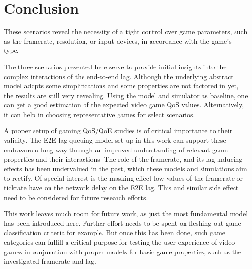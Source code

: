 \section{Conclusion}
\label{sec:conclusion}

These scenarios reveal the necessity of a tight control over game parameters, such as the framerate, resolution, or input devices, in accordance with the game's type.


The three scenarios presented here serve to provide initial insights into the complex interactions of the end-to-end lag. Although the underlying abstract model adopts some simplifications and some properties are not factored in yet, the results are still very revealing. Using the model and simulator as baseline, one can get a good estimation of the expected video game \gls{QoS} values. Alternatively, it can help in choosing representative games for select scenarios.


A proper setup of gaming \gls{QoS}/\gls{QoE} studies is of critical importance to their validity. The \gls{E2E} lag queuing model set up in this work can support these endeavors a long way through an improved understanding of relevant game properties and their interactions. The role of the framerate, and its lag-inducing effects has been undervalued in the past, which these models and simulations aim to rectify. Of special interest is the masking effect low values of the framerate or tickrate have on the network delay on the \gls{E2E} lag. This and similar side effect need to be considered for future research efforts.


This work leaves much room for future work, as just the most fundamental model has been introduced here. Further effort needs to be spent on fleshing out game classification criteria for example. But once this has been done, such game categories can fulfill a critical purpose for testing the user experience of video games in conjunction with proper models for basic game properties, such as the investigated framerate and lag.
